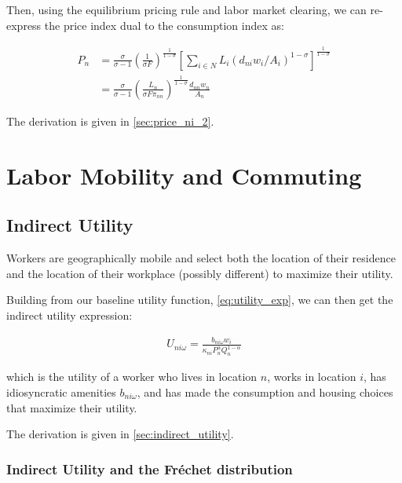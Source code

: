 \documentclass[10pt]{article}
\begin{document}
Then, using the equilibrium pricing rule
and labor market clearing, we can 
re-express the price index dual to the consumption index as:

\begin{align}
    P_n & =\frac{\sigma}{\sigma-1}\left(\frac{1}{\sigma F}\right)^{\frac{1}{1-\sigma}}\left[\sum_{i \in N} L_i\left(d_{n i} w_i / A_i\right)^{1-\sigma}\right]^{\frac{1}{1-\sigma}} \\
    & =\frac{\sigma}{\sigma-1}\left(\frac{L_n}{\sigma F \pi_{n n}}\right)^{\frac{1}{1-\sigma}} \frac{d_{n n} w_n}{A_n} \label{eq:price_index_p_n_2}
\end{align}

The derivation is given in \autoref{sec:price_ni_2}.


\section{Labor Mobility and Commuting}

\subsection{Indirect Utility}

Workers are geographically mobile and select 
both the location of their residence and the location of 
their workplace (possibly different) to maximize their 
utility. 

Building from our baseline utility function,
\eqref{eq:utility_exp}, we can 
then get the indirect utility expression:

\begin{align}
    U_{n i \omega}=\frac{b_{n i \omega} w_i}{\kappa_{n i} P_n^\alpha Q_n^{1-\alpha}} \label{eq:indirect_utility}
\end{align}

which is the utility of a worker who lives in location $n$,
works in location $i$, has idiosyncratic amenities $b_{n i \omega}$,
and has made the consumption and housing choices that
maximize their utility.

The derivation is given in \autoref{sec:indirect_utility}.

\subsubsection{Indirect Utility and the Fréchet distribution}
\end{document}
